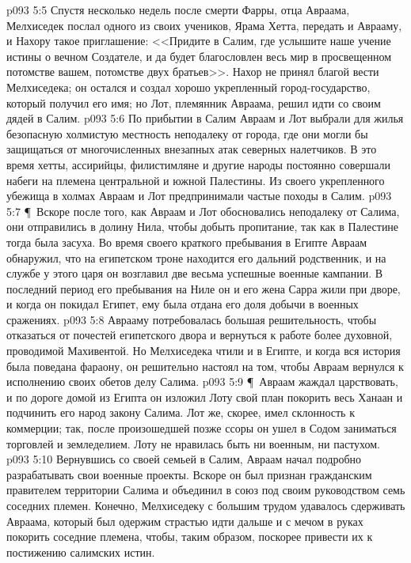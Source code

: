 \vs p093 5:5 Спустя несколько недель после смерти Фарры, отца Авраама, Мелхиседек послал одного из своих учеников, Ярама Хетта, передать и Аврааму, и Нахору такое приглашение: <<Придите в Салим, где услышите наше учение истины о вечном Создателе, и да будет благословлен весь мир в просвещенном потомстве вашем, потомстве двух братьев>>. Нахор не принял благой вести Мелхиседека; он остался и создал хорошо укрепленный город\hyp{}государство, который получил его имя; но Лот, племянник Авраама, решил идти со своим дядей в Салим.
\vs p093 5:6 По прибытии в Салим Авраам и Лот выбрали для жилья безопасную холмистую местность неподалеку от города, где они могли бы защищаться от многочисленных внезапных атак северных налетчиков. В это время хетты, ассирийцы, филистимляне и другие народы постоянно совершали набеги на племена центральной и южной Палестины. Из своего укрепленного убежища в холмах Авраам и Лот предпринимали частые походы в Салим.
\vs p093 5:7 \P\ Вскоре после того, как Авраам и Лот обосновались неподалеку от Салима, они отправились в долину Нила, чтобы добыть пропитание, так как в Палестине тогда была засуха. Во время своего краткого пребывания в Египте Авраам обнаружил, что на египетском троне находится его дальний родственник, и на службе у этого царя он возглавил две весьма успешные военные кампании. В последний период его пребывания на Ниле он и его жена Сарра жили при дворе, и когда он покидал Египет, ему была отдана его доля добычи в военных сражениях.
\vs p093 5:8 Аврааму потребовалась большая решительность, чтобы отказаться от почестей египетского двора и вернуться к работе более духовной, проводимой Махивентой. Но Мелхиседека чтили и в Египте, и когда вся история была поведана фараону, он решительно настоял на том, чтобы Авраам вернулся к исполнению своих обетов делу Салима.
\vs p093 5:9 \P\ Авраам жаждал царствовать, и по дороге домой из Египта он изложил Лоту свой план покорить весь Ханаан и подчинить его народ закону Салима. Лот же, скорее, имел склонность к коммерции; так, после произошедшей позже ссоры он ушел в Содом заниматься торговлей и земледелием. Лоту не нравилась быть ни военным, ни пастухом.
\vs p093 5:10 Вернувшись со своей семьей в Салим, Авраам начал подробно разрабатывать свои военные проекты. Вскоре он был признан гражданским правителем территории Салима и объединил в союз под своим руководством семь соседних племен. Конечно, Мелхиседеку с большим трудом удавалось сдерживать Авраама, который был одержим страстью идти дальше и с мечом в руках покорить соседние племена, чтобы, таким образом, поскорее привести их к постижению салимских истин.
